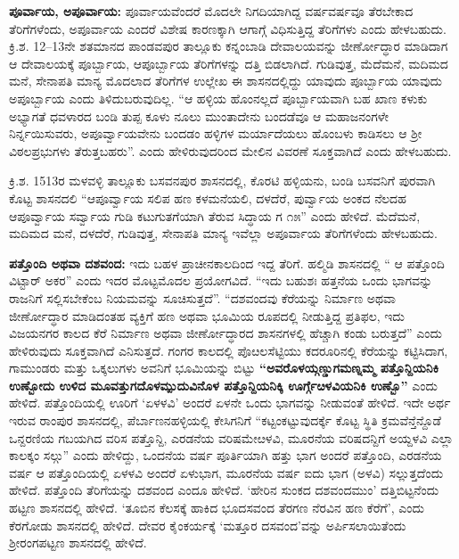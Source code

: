 \textbf{ಪೂರ್ವಾಯ, ಅಪೂರ್ವಾಯ: } ಪೂರ್ವಾಯವೆಂದರೆ ಮೊದಲೇ ನಿಗದಿಯಾಗಿದ್ದ ವರ್ಷವರ್ಷವೂ ತೆರಬೇಕಾದ ತೆರಿಗೆಗಳೆಂದು, ಅಪೂರ್ವಾಯ ಎಂದರೆ ವಿಶೇಷ ಕಾರಣಕ್ಕಾಗಿ ಆಗಾಗ್ಗೆ ವಿಧಿಸುತ್ತಿದ್ದ ತೆರಿಗೆಗಳು ಎಂದು ಹೇಳಬಹುದು. ಕ್ರಿ.ಶ. 12–13ನೇ ಶತಮಾನದ ಪಾಂಡವಪುರ ತಾಲ್ಲೂಕು ಕನ್ನಂಬಾಡಿ ದೇವಾಲಯವನ್ನು ಜೀರ್ಣೋದ್ಧಾರ ಮಾಡಿದಾಗ ಆ ದೇವಾಲಯಕ್ಕೆ ಪೂರ್ಬ್ಬಾಯ, ಆಪೂರ್ಬ್ಬಾಯ ತೆರಿಗೆಗಳನ್ನು ದತ್ತಿ ಬಿಡಲಾಗಿದೆ. ಗುಡಿವುತ್ತ, ಮೆದೆಮನೆ, ಮದಿಮದ ಮನೆ, ಸೇನಾಪತಿ ಮಾನ್ಯ ಮೊದಲಾದ ತೆರಿಗೆಗಳ ಉಲ್ಲೇಖ ಈ ಶಾಸನದಲ್ಲಿದ್ದು ಯಾವುದು ಪೂರ್ಬ್ಬಾಯ ಯಾವುದು ಅಪೂರ್ಬ್ಬಾಯ ಎಂದು ತಿಳಿದುಬರುವುದಿಲ್ಲ. “ಆ ಹಳ್ಳಿಯ ಹೊಂನಲ್ಲದೆ ಪೂರ್ಬ್ಬಾಯವಾಗಿ ಬಹ ಖಾಣ ಕಳುಕು ಅಭ್ಯಾಗತೆ ಧವಳಾರದ ಬಂಡಿ ತುಪ್ಪ ಕೂಳು ನೂಲು ಮುಂತಾದೇನು ಬಂದಡೆವೂ ಆ ಮಹಾಜನಂಗಳೇ ನಿರ್ನ್ನಯಿಸುವರು, ಅಪೂರ್ವ್ವಾಯವೇನು ಬಂದಡಂ ಹಳ್ಳಿಗಳ ಮರ್ಯಾದೆಯಲು ಹೊಂಬಳು ಕಾಡಿಸಲು ಆ ಶ‍್ರೀ ವಿಠಲಪ್ರಭುಗಳು ತೆರುತ್ತಬಹರು”. ಎಂದು ಹೇಳಿರುವುದರಿಂದ ಮೇಲಿನ ವಿವರಣೆ ಸೂಕ್ತವಾಗಿದೆ ಎಂದು ಹೇಳಬಹುದು.

ಕ್ರಿ.ಶ. 1513ರ ಮಳವಳ್ಳಿ ತಾಲ್ಲೂಕು ಬಸವನಪುರ ಶಾಸನದಲ್ಲಿ, ಕೊರಟಿ ಹಳ್ಳಿಯನು, ಬಂಡಿ ಬಸವನಿಗೆ ಪುರವಾಗಿ ಕೊಟ್ಟ ಶಾಸನದಲಿ “ಆಪೂರ್ವ್ವಾಯ ಸಲಿಪ ಹಣ ಕಳಮನೆಯಲಿ, ದಳದೆರೆ, ಪುರ್ವ್ವಾಯ ಅಂಕದ ನೆಲದಹ ಆಪೂರ್ವ್ವಾಯ ಸರ್ವ್ವಾಯ ಗುಡಿ ಕಟುಗುತಗೆಯಾಗಿ ತೆರುವ ಸಿದ್ಧಾಯ ಗ ೧೫” ಎಂದು ಹೇಳಿದೆ. ಮೆದೆಮನೆ, ಮದಿಮದ ಮನೆ, ದಳದೆರೆ, ಗುಡಿವುತ್ತ, ಸೇನಾಪತಿ ಮಾನ್ಯ ಇವೆಲ್ಲಾ ಅಪೂರ್ವಾಯ ತೆರಿಗೆಗಳೆಂದು ಹೇಳಬಹುದು.

\textbf{ಪತ್ತೊಂದಿ ಅಥವಾ ದಶವಂದ:} ಇದು ಬಹಳ ಪ್ರಾಚೀನಕಾಲದಿಂದ ಇದ್ದ ತೆರಿಗೆ. ಹಲ್ಮಿಡಿ ಶಾಸನದಲ್ಲಿ “ ಆ ಪತ್ತೊಂದಿ ವಿಟ್ಟಾರ್​ ಅಕರ” ಎಂದು ಇದರ ಮೊಟ್ಟಮೊದಲ ಪ್ರಯೋಗವಿದೆ. “ಇದು ಬಹುಶಃ ಹತ್ತನೆಯ ಒಂದು ಭಾಗವನ್ನು ರಾಜನಿಗೆ ಸಲ್ಲಿಸಬೇಕೆಂಬ ನಿಯಮವನ್ನು ಸೂಚಿಸುತ್ತದೆ”. “ದಶವಂದವು ಕೆರೆಯನ್ನು ನಿರ್ಮಾಣ ಅಥವಾ ಜೀರ್ಣೋದ್ಧಾರ ಮಾಡಿದಂತಹ ವ್ಯಕ್ತಿಗೆ ಹಣ ಅಥವಾ ಭೂಮಿಯ ರೂಪದಲ್ಲಿ ನೀಡುತ್ತಿದ್ದ ಪ್ರತಿಫಲ, ಇದು ವಿಜಯನಗರ ಕಾಲದ ಕೆರೆ ನಿರ್ಮಾಣ ಅಥವಾ ಜೀರ್ಣೋದ್ಧಾರದ ಶಾಸನಗಳಲ್ಲಿ ಹೆಚ್ಚಾಗಿ ಕಂಡು ಬರುತ್ತದೆ” ಎಂದು ಹೇಳಿರುವುದು ಸೂಕ್ತವಾಗಿದೆ ಎನಿಸುತ್ತದೆ. ಗಂಗರ ಕಾಲದಲ್ಲಿ ಪೊೞಲಸೆಟ್ಟಿಯು ಕದರೂರಿನಲ್ಲಿ ಕೆರೆಯನ್ನು ಕಟ್ಟಿಸಿದಾಗ, ಗಾಮುಂಡರು ಮತ್ತು ಒಕ್ಕಲುಗಳು ಅವನಿಗೆ ಭೂಮಿಯನ್ನು ಬಿಟ್ಟು \textbf{“ಅವರೊಳಯ್ಗಣ್ಡುಗಮಣ್ನಮ್ಮ ಪತ್ತೊನ್ದಿಯನಿಕಿ ಉಣ್ಬೋದು ಉಳಿದ ಮೂವತ್ತುಗದೊಳಮ್ಪುದುವಿನೊಳ ಪತ್ತೊನ್ದಿಯನಿಕ್ಕಿ ಊರ್ಗ್ಗೆೞಳವಿಯನಿಕಿ ಉಣ್ಬೊ”} ಎಂದು ಹೇಳಿದೆ. ಪತ್ತೊಂದಿಯಲ್ಲಿ ಊರಿಗೆ ‘ಏಳಳವಿ’ ಅಂದರೆ ಏಳನೇ ಒಂದು ಭಾಗವನ್ನು ನೀಡುವಂತೆ ಹೇಳಿದೆ. ಇದೇ ಅರ್ಥ ಇರುವ ರಾಂಪುರ ಶಾಸನದಲ್ಲಿ, ಪೆರ್ಬಾಣನಹಳ್ಳಿಯಲ್ಲಿ ಕೇಸಿಗನಿಗೆ “ಕಟ್ಟಂಕಟ್ಟುವುದರ್ಕ್ಕೆ ಕೊಟ್ಟ ಸ್ಥಿತಿ ಕ್ರಮವೆನ್ತೆನ್ದೊಡೆ ಒನ್ದರಣಿಯ ಗಬಯಗಿದ ವರಿಸ ಪತ್ತೊನ್ದಿ, ಎರಡನೆಯ ವರಿಷಮೇೞಳವಿ, ಮೂರನೆಯ ವರಿಷದನ್ದಿಗೆ ಅಯ್ದಳವಿ ಎಲ್ಲಾ ಕಾಲಕ್ಕಂ ಸಲ್ಗು” ಎಂದು ಹೇಳಿದ್ದು, ಒಂದನೆಯ ವರ್ಷ ಪೂರ್ತಿಯಾಗಿ ಹತ್ತು ಭಾಗ ಅಂದರೆ ಪತ್ತೊಂದಿ, ಎರಡನೆಯ ವರ್ಷ ಆ ಪತ್ತೊಂದಿಯಲ್ಲಿ ಏಳಳವಿ ಅಂದರೆ ಏಳುಭಾಗ, ಮೂರನೆಯ ವರ್ಷ ಐದು ಭಾಗ (ಅಳವಿ) ಸಲ್ಲುತ್ತದೆಂದು ಹೇಳಿದೆ. ಪತ್ತೊಂದಿ ತೆರಿಗೆಯನ್ನು ದಶವಂದ ಎಂದೂ ಹೇಳಿದೆ. ‘ಹೇರಿನ ಸುಂಕದ ದಶವಂದಮುಂ’ ದತ್ತಿಬಿಟ್ಟನೆಂದು ಹಟ್ಟಣ ಶಾಸನದಲ್ಲಿ ಹೇಳಿದೆ. ‘ತೂಬಿನ ಕೆಲಸಕ್ಕೆ ಹಾಕಿದ ಭೂದಸವಂದ ತೆರಗಣ ನೆರವಿನ ಹಣ ಕೆರೆಗೆ’, ಎಂದು ಕೆರಗೋಡು ಶಾಸನದಲ್ಲಿ ಹೇಳಿದೆ. ದೇವರ ಕೈಂಕರ್ಯಕ್ಕೆ ‘ಮತ್ತೂರ ದಸವಂದ’ವನ್ನು ಅರ್ಪಿಸಲಾಯಿತೆಂದು ಶ‍್ರೀರಂಗಪಟ್ಟಣ ಶಾಸನದಲ್ಲಿ ಹೇಳಿದೆ.

